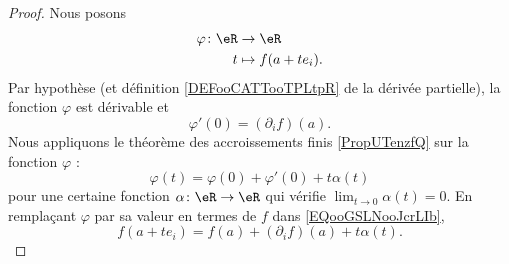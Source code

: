 \begin{proof}
	Nous posons
	\begin{equation}
		\begin{aligned}
			\varphi\colon \eR & \to \eR             \\
			t                 & \mapsto f(a+ te_i).
		\end{aligned}
	\end{equation}
	Par hypothèse (et définition \ref{DEFooCATTooTPLtpR} de la dérivée partielle), la fonction \( \varphi\) est dérivable et
	\begin{equation}
		\varphi'(0)=(\partial_if)(a).
	\end{equation}
	Nous appliquons le théorème des accroissements finis \ref{PropUTenzfQ} sur la fonction \( \varphi\) :
	\begin{equation}        \label{EQooGSLNooJcrLIb}
		\varphi(t)=\varphi(0)+\varphi'(0)+t\alpha(t)
	\end{equation}
	pour une certaine fonction \( \alpha\colon \eR\to \eR\) qui vérifie \( \lim_{t\to 0} \alpha(t)=0\). En remplaçant \( \varphi\) par sa valeur en termes de \( f\) dans \eqref{EQooGSLNooJcrLIb},
	\begin{equation}
		f(a+te_i)=f(a)+(\partial_if)(a)+t\alpha(t).
	\end{equation}
\end{proof}

